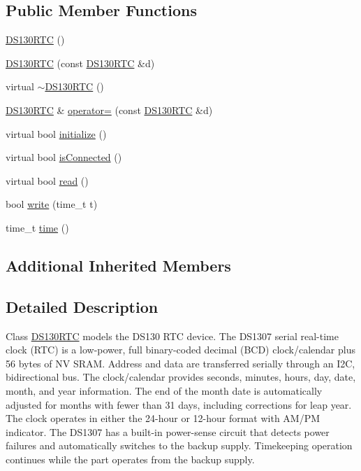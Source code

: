 \subsection*{Public Member Functions}
\begin{DoxyCompactItemize}
\item 
\hyperlink{classsmrtobj_1_1i2c_1_1_d_s130_r_t_c_a1193dff2a364288f290e0fe3635c0cb6}{D\+S130\+R\+T\+C} ()
\item 
\hyperlink{classsmrtobj_1_1i2c_1_1_d_s130_r_t_c_a60a524983714ba79ec0cce24065c48ea}{D\+S130\+R\+T\+C} (const \hyperlink{classsmrtobj_1_1i2c_1_1_d_s130_r_t_c}{D\+S130\+R\+T\+C} \&d)
\item 
virtual \hyperlink{classsmrtobj_1_1i2c_1_1_d_s130_r_t_c_ac55df67fb47b399a26f3afada798674d}{$\sim$\+D\+S130\+R\+T\+C} ()
\item 
\hyperlink{classsmrtobj_1_1i2c_1_1_d_s130_r_t_c}{D\+S130\+R\+T\+C} \& \hyperlink{classsmrtobj_1_1i2c_1_1_d_s130_r_t_c_a3b041b1c4010942f43c164889fbc55ef}{operator=} (const \hyperlink{classsmrtobj_1_1i2c_1_1_d_s130_r_t_c}{D\+S130\+R\+T\+C} \&d)
\item 
virtual bool \hyperlink{classsmrtobj_1_1i2c_1_1_d_s130_r_t_c_aef59c049dbca2d78877e607e8009452c}{initialize} ()
\item 
virtual bool \hyperlink{classsmrtobj_1_1i2c_1_1_d_s130_r_t_c_ad8630568cd75431db924e2e723ebfcb4}{is\+Connected} ()
\item 
virtual bool \hyperlink{classsmrtobj_1_1i2c_1_1_d_s130_r_t_c_afc3af98fb550808741d738655ce642d1}{read} ()
\item 
bool \hyperlink{classsmrtobj_1_1i2c_1_1_d_s130_r_t_c_a3948a04b2efbb900ca2ec8a9ebd6dd79}{write} (time\+\_\+t t)
\item 
time\+\_\+t \hyperlink{classsmrtobj_1_1i2c_1_1_d_s130_r_t_c_aa83e66e3af3251924b7411daa55ce759}{time} ()
\end{DoxyCompactItemize}
\subsection*{Additional Inherited Members}


\subsection{Detailed Description}
Class \hyperlink{classsmrtobj_1_1i2c_1_1_d_s130_r_t_c}{D\+S130\+R\+T\+C} models the D\+S130 R\+T\+C device. The D\+S1307 serial real-\/time clock (R\+T\+C) is a low-\/power, full binary-\/coded decimal (B\+C\+D) clock/calendar plus 56 bytes of N\+V S\+R\+A\+M. Address and data are transferred serially through an I2\+C, bidirectional bus. The clock/calendar provides seconds, minutes, hours, day, date, month, and year information. The end of the month date is automatically adjusted for months with fewer than 31 days, including corrections for leap year. The clock operates in either the 24-\/hour or 12-\/hour format with A\+M/\+P\+M indicator. The D\+S1307 has a built-\/in power-\/sense circuit that detects power failures and automatically switches to the backup supply. Timekeeping operation continues while the part operates from the backup supply.

